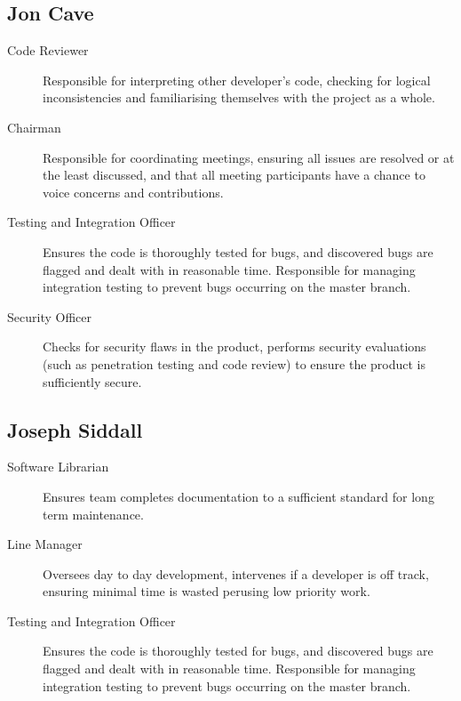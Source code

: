 \subsection{Jon Cave}
\begin{description}
	
	\item[Code Reviewer] Responsible for interpreting other developer's code, checking for logical inconsistencies and familiarising themselves with the project as a whole.
     
    \item[Chairman] Responsible for coordinating meetings, ensuring all issues are resolved or at the least discussed, and that all meeting participants have a chance to voice concerns and contributions.
    
    \item[Testing and Integration Officer] Ensures the code is thoroughly tested for bugs, and discovered bugs are flagged and dealt with in reasonable time. Responsible for managing integration testing to prevent bugs occurring on the master branch.
     
    \item[Security Officer] Checks for security flaws in the product, performs security evaluations (such as penetration testing and code review) to ensure the product is sufficiently secure.

\end{description}

\subsection{Joseph Siddall}
\begin{description}

	\item[Software Librarian] Ensures team completes documentation to a sufficient standard for long term maintenance. 
     
    \item[Line Manager] Oversees day to day development, intervenes if a developer is off track, ensuring minimal time is wasted perusing low priority work.
    
    \item[Testing and Integration Officer] Ensures the code is thoroughly tested for bugs, and discovered bugs are flagged and dealt with in reasonable time. Responsible for managing integration testing to prevent bugs occurring on the master branch.
    
\end{description}

